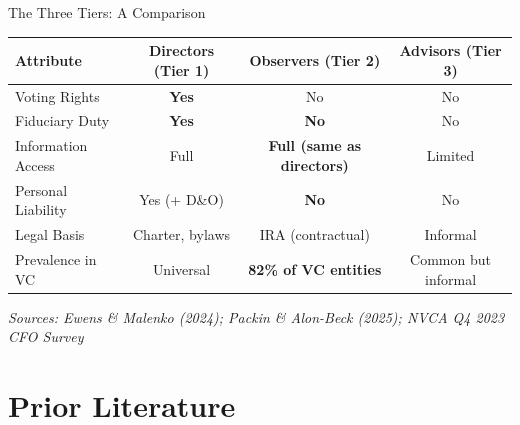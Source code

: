 \documentclass[aspectratio=169,12pt]{beamer}
\begin{document}
\begin{frame}{The Three Tiers: A Comparison}
\centering
\footnotesize
\begin{tabular}{@{}l c c c@{}}
\toprule
\textbf{Attribute} & \textbf{Directors (Tier 1)} & \textbf{Observers (Tier 2)} & \textbf{Advisors (Tier 3)} \\
\midrule
Voting Rights & \textcolor{harvardcrimson}{\textbf{Yes}} & No & No \\
Fiduciary Duty & \textcolor{harvardcrimson}{\textbf{Yes}} & \textbf{No} & No \\
Information Access & Full & \textbf{Full (same as directors)} & Limited \\
Personal Liability & Yes (+ D\&O) & \textbf{No} & No \\
Legal Basis & Charter, bylaws & IRA (contractual) & Informal \\
\addlinespace
Prevalence in VC & Universal & \textbf{82\% of VC entities} & Common but informal \\
\bottomrule
\end{tabular}
\vspace{0.5em}

\textit{\scriptsize Sources: Ewens \& Malenko (2024); Packin \& Alon-Beck (2025); NVCA Q4 2023 CFO Survey}
\end{frame}

\section{Prior Literature}
\end{document}
